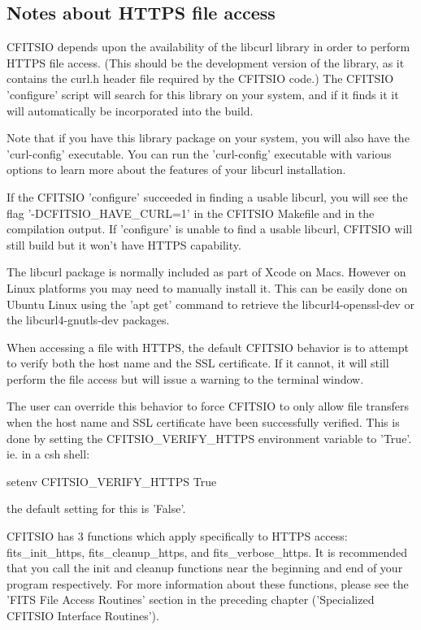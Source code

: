 \documentclass[11pt]{book}
\begin{document}
\subsection{Notes about HTTPS file access}

CFITSIO depends upon the availability of the libcurl library in order to perform 
HTTPS file access.  (This should be the development version of the library, as
it contains the curl.h header file required by the CFITSIO code.)   The CFITSIO
'configure' script will search for this library on your system, and if it finds it 
it will automatically be incorporated into the build.  

Note that if you have this library package on your system, you will also have the 'curl-config'
executable.  You can run the 'curl-config' executable with various options to learn
more about the features of your libcurl installation.

If the CFITSIO 'configure' succeeded in finding a usable libcurl, you will see the flag
'-DCFITSIO\_HAVE\_CURL=1' in the CFITSIO Makefile and in the compilation output.  
If 'configure' is unable to find a usable libcurl, CFITSIO will still build 
but it won't have HTTPS capability.

The libcurl package is normally included as part of Xcode on Macs.  However on Linux platforms you 
may need to manually install it. This can be easily done on Ubuntu Linux using
the 'apt get' command to retrieve the libcurl4-openssl-dev or the libcurl4-gnutls-dev packages.

When accessing a file with HTTPS, the default CFITSIO behavior is to attempt
to verify both the host name and the SSL certificate.  If it cannot, it will still 
perform the file access but will issue a warning to the terminal window.

The user can override this behavior to force CFITSIO to only allow file transfers
when the host name and SSL certificate have been successfully verified.  This is
done by setting the CFITSIO\_VERIFY\_HTTPS environment variable to 'True'. ie. in a
csh shell:

setenv CFITSIO\_VERIFY\_HTTPS True

the default setting for this is 'False'.

CFITSIO has 3 functions which apply specifically to HTTPS access:  fits\_init\_https, 
fits\_cleanup\_https, and fits\_verbose\_https. It is recommended that you call the 
init and cleanup functions near the beginning and end of your program respectively. 
For more information about these functions, please see the 'FITS File Access Routines'
section in the preceding chapter ('Specialized CFITSIO Interface Routines'). 
\end{document}
